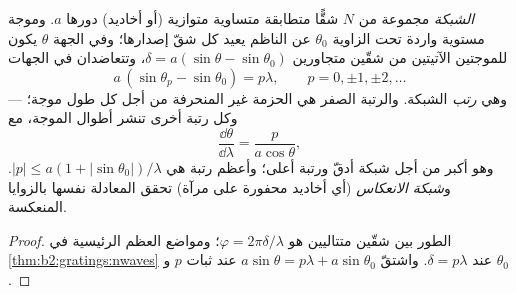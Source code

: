 \begin{proposition}\label{prop:b2:gratings:equation}
\emph{الشبكة} مجموعة من $N$ شقًّا متطابقة متساوية  متوازية
(أو أخاديد) دورها $a$. وموجة مستوية واردة تحت الزاوية $\theta_0$
عن الناظم يعيد كل شقّ إصدارها؛ وفي الجهة $\theta$ يكون
للموجتين الآتيتين من شقّين متجاورين  $\delta = a(\sin\theta
- \sin\theta_0)$، وتتعاضدان في الجهات
\[
a\,(\sin\theta_p - \sin\theta_0) = p\lambda , \qquad p = 0, \pm1, \pm2, \dots
\]
--- وهي \emph{رتب} الشبكة. والرتبة الصفر هي الحزمة
غير المنحرفة من أجل كل طول موجة؛ وكل رتبة أخرى تنشر أطوال الموجة،
مع \emph{}
\[
\frac{\dd\theta}{\dd\lambda} = \frac{p}{a\cos\theta} ,
\]
وهو أكبر من أجل شبكة أدقّ ورتبة أعلى؛ وأعظم رتبة هي
$|p| \le a(1 + |\sin\theta_0|)/\lambda$. و\emph{شبكة الانعكاس} (أي أخاديد محفورة
على مرآة) تحقق المعادلة نفسها بالزوايا المنعكسة.
\end{proposition}

\begin{proof}
الطور بين شقّين متتاليين هو $\varphi = 2\pi\delta/\lambda$؛ ومواضع العظم
الرئيسية في \cref{thm:b2:gratings:nwaves} عند $\delta = p\lambda$.
واشتقّ $a\sin\theta = p\lambda + a\sin\theta_0$ عند ثبات $p$ و $\theta_0$.
\end{proof}

